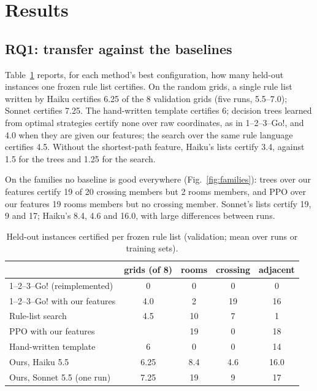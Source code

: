 \section{Results}\label{sec:results}

\subsection{RQ1: transfer against the baselines}
Table~\ref{tab:rq1} reports, for each method's best configuration, how many held-out instances one frozen rule list
certifies. On the random grids, a single rule list written by Haiku certifies 6.25 of the 8 validation grids (five
runs, 5.5--7.0); Sonnet certifies 7.25. The hand-written template certifies 6; decision trees learned from optimal
strategies certify none over raw coordinates, as in 1--2--3--Go!, and 4.0 when they are given our features; the
search over the same rule language certifies 4.5. Without the shortest-path feature, Haiku's lists certify 3.4,
against 1.5 for the trees and 1.25 for the search.

On the families no baseline is good everywhere (Fig.~\ref{fig:families}): trees over our features certify 19 of 20
crossing members but 2 rooms members, and PPO over our features 19 rooms members but no crossing member. Sonnet's
lists certify 19, 9 and 17; Haiku's 8.4, 4.6 and 16.0, with large differences between runs.

\begin{table}[t]
\caption{Held-out instances certified per frozen rule list (validation; mean over runs or training sets).}
\label{tab:rq1}
\centering\small
\begin{tabular}{lcccc}
\toprule
 & grids (of 8) & rooms & crossing & adjacent \\
\midrule
1--2--3--Go! (reimplemented) & 0 & 0 & 0 & 0 \\
1--2--3--Go! with our features & 4.0 & 2 & 19 & 16 \\
Rule-list search & 4.5 & 10 & 7 & 1 \\
PPO with our features & \todo{} & 19 & 0 & 18 \\
Hand-written template & 6 & 0 & 0 & 14 \\
Ours, Haiku 5.5 & 6.25 & 8.4 & 4.6 & 16.0 \\
Ours, Sonnet 5.5 (one run) & 7.25 & 19 & 9 & 17 \\
\bottomrule
\end{tabular}
\end{table}

